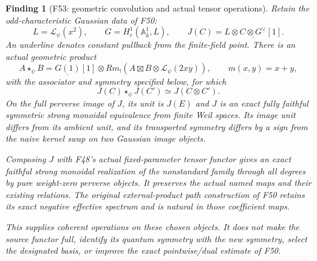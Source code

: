 \documentclass[11pt,a4paper]{article}
\newcommand{\A}{\mathbb A}\newcommand{\PP}{\mathbb P}\newcommand{\GL}{\mathrm{GL}}
\newcommand{\fid}[1]{\textsf{#1}}\newcommand{\gate}[1]{\textsf{#1}}
\theoremstyle{named}\newtheorem{finding}{Finding}[section]
\theoremstyle{definition}\newtheorem{definition}[finding]{Definition}
\theoremstyle{remark}\newtheorem{remark}[finding]{Remark}
\begin{document}
\begin{finding}[\fid{F53}: geometric convolution and actual tensor operations]
\label{f:gaussianconvolution}
Retain the odd-characteristic Gaussian data of \fid{F50}:
\[
 L=\mathcal L_\psi(x^2),\qquad
 G=H_c^1(\A^1_{\bar k},L),\qquad
 J(C)=L\otimes\underline{C\otimes G^\vee}[1].
\]
An underline denotes constant pullback from the finite-field point.
There is an actual geometric product
\begin{equation}\label{eq:gaussianstar}
 A\star_\psi B=
 \underline{G(1)}[1]\otimes
 Rm_!\left(A\boxtimes B\otimes\mathcal L_\psi(2xy)\right),
 \qquad m(x,y)=x+y,
\end{equation}
with the associator and symmetry specified below, for which
\[
 J(C)\star_\psi J(C')\simeq J(C\otimes C').
\]
On the full perverse image of $J$, its unit is $J(E)$ and $J$ is
an exact fully faithful symmetric strong monoidal equivalence from
finite Weil spaces. Its image unit differs from its ambient unit,
and its transported symmetry differs by a sign from the naive
kernel swap on two Gaussian image objects.

Composing $J$ with \fid{F48}'s actual fixed-parameter tensor
functor gives an exact faithful strong monoidal realization of the
nonstandard family through all degrees by pure weight-zero
perverse objects. It preserves the actual named maps and their
existing relations. The original external-product path construction
of \fid{F50} retains its exact negative effective spectrum and is
natural in those coefficient maps.

This supplies coherent operations on these chosen objects.
It does not make the source functor full, identify its quantum
symmetry with the new symmetry, select the designated basis, or
improve the exact pointwise/dual estimate of \fid{F50}.
\end{finding}
\end{document}
